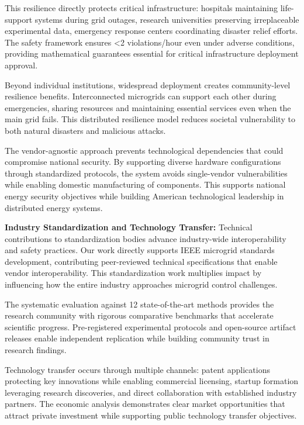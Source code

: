 \documentclass[12pt]{article}
\begin{document}
This resilience directly protects critical infrastructure: hospitals maintaining life-support systems during grid outages, research universities preserving irreplaceable experimental data, emergency response centers coordinating disaster relief efforts. The safety framework ensures <2 violations/hour even under adverse conditions, providing mathematical guarantees essential for critical infrastructure deployment approval.

Beyond individual institutions, widespread deployment creates community-level resilience benefits. Interconnected microgrids can support each other during emergencies, sharing resources and maintaining essential services even when the main grid fails. This distributed resilience model reduces societal vulnerability to both natural disasters and malicious attacks.

The vendor-agnostic approach prevents technological dependencies that could compromise national security. By supporting diverse hardware configurations through standardized protocols, the system avoids single-vendor vulnerabilities while enabling domestic manufacturing of components. This supports national energy security objectives while building American technological leadership in distributed energy systems.

\textbf{Industry Standardization and Technology Transfer:} Technical contributions to standardization bodies advance industry-wide interoperability and safety practices. Our work directly supports IEEE microgrid standards development, contributing peer-reviewed technical specifications that enable vendor interoperability. This standardization work multiplies impact by influencing how the entire industry approaches microgrid control challenges.

The systematic evaluation against 12 state-of-the-art methods \cite{our2024comparative} provides the research community with rigorous comparative benchmarks that accelerate scientific progress. Pre-registered experimental protocols and open-source artifact releases enable independent replication while building community trust in research findings.

Technology transfer occurs through multiple channels: patent applications protecting key innovations while enabling commercial licensing, startup formation leveraging research discoveries, and direct collaboration with established industry partners. The economic analysis demonstrates clear market opportunities that attract private investment while supporting public technology transfer objectives.
\end{document}
